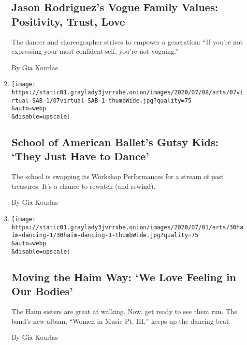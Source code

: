 \begin{enumerate}
  \hypertarget{jason-rodriguezs-vogue-family-values-positivity-trust-love}{%
  \subsection{Jason Rodriguez's Vogue Family Values: Positivity, Trust,
  Love}\label{jason-rodriguezs-vogue-family-values-positivity-trust-love}}

  The dancer and choreographer strives to empower a generation: ``If
  you're not expressing your most confident self, you're not voguing.''

  By Gia Kourlas
\item
  \href{/2020/07/07/arts/dance/school-of-american-ballet-workshop-performances.html}{}

  \texttt{[image: https://static01.graylady3jvrrxbe.onion/images/2020/07/08/arts/07virtual-SAB-1/07virtual-SAB-1-thumbWide.jpg?quality=75\\\&auto=webp\\\&disable=upscale]}

  \hypertarget{school-of-american-ballets-gutsy-kids-they-just-have-to-dance}{%
  \subsection{School of American Ballet's Gutsy Kids: `They Just Have to
  Dance'}\label{school-of-american-ballets-gutsy-kids-they-just-have-to-dance}}

  The school is swapping its Workshop Performances for a stream of past
  treasures. It's a chance to rewatch (and rewind).

  By Gia Kourlas
\item
  \href{/2020/06/30/arts/dance/haim-dance-videos.html}{}

  \texttt{[image: https://static01.graylady3jvrrxbe.onion/images/2020/07/01/arts/30haim-dancing-1/30haim-dancing-1-thumbWide.jpg?quality=75\\\&auto=webp\\\&disable=upscale]}

  \hypertarget{moving-the-haim-way-we-love-feeling-in-our-bodies}{%
  \subsection{Moving the Haim Way: `We Love Feeling in Our
  Bodies'}\label{moving-the-haim-way-we-love-feeling-in-our-bodies}}

  The Haim sisters are great at walking. Now, get ready to see them run.
  The band's new album, ``Women in Music Pt. III,'' keeps up the dancing
  beat.

  By Gia Kourlas
\end{enumerate}

